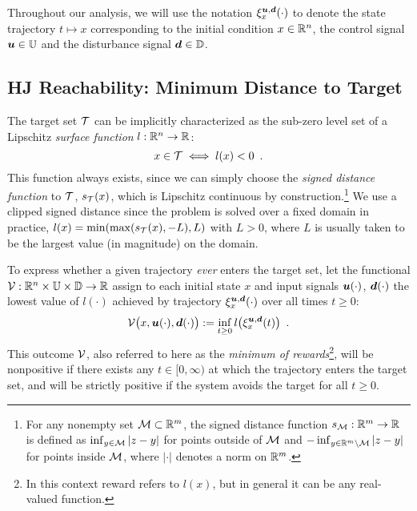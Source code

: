 Throughout our analysis, we will use the notation $\xi_{x}^{\bm{u},\bm{d}}(\cdot)$ to denote the state trajectory $t\mapsto x$ corresponding to the initial condition $x\in\mathbb{R}^n$, the control signal $\bm{u}\in\mathbb{U}$ and the disturbance signal $\bm{d}\in\mathbb{D}$.


\subsection{HJ Reachability: Minimum Distance to Target}
The target set $\mathcal{T}$ can be implicitly characterized as the sub-zero level set of a Lipschitz \emph{surface function} $l:\mathbb{R}^n\rightarrow\mathbb{R}$: 
\begin{equation}\label{eq:l}
x\in\mathcal{T}\iff l(x)<0 \enspace.
\end{equation}
This function always exists, since we can simply choose the \emph{signed distance function} to $\mathcal{T}$,  $s_{\mathcal{T}}(x)$, which is Lipschitz continuous by construction.\footnote{ For any nonempty set $\mathcal{M}\subset\mathbb{R}^m$, the signed distance function $s_{\mathcal{M}}:\mathbb{R}^m\to\mathbb{R}$  is defined as
$\inf_{y\in\mathcal{M}} |z-y|$ for points outside of $\mathcal{M}$ and $ -\inf_{y\in\mathbb{R}^m\setminus\mathcal{M}} |z-y|$ for points inside $\mathcal{M}$, where $|\cdot|$ denotes a norm on $\mathbb{R}^m$.} We use a clipped signed distance since the problem is solved over a fixed domain in practice, $l(x) = \min(\max(s_{\mathcal{T}}(x), -L), L)$ with $L>0$, where $L$ is usually taken to be the largest value (in magnitude) on the domain.

To express whether a given trajectory \emph{ever} enters the target set, let the functional $\mathcal{V}:\mathbb{R}^n\times\mathbb{U}\times\mathbb{D}\to\mathbb{R}$ assign to each initial state $x$ and input signals $\bm{u}(\cdot)$, $\bm{d}(\cdot)$ the lowest value of $l(\cdot)$ achieved by trajectory $\xi_{x}^{\bm{u}, \bm{d}}(\cdot)$ over all times $t\ge0$: 
\begin{equation}\label{eq:min_dist_functional}
\mathcal{V}\big(x,\bm{u}(\cdot),\bm{d}(\cdot)\big) := \inf_{t\ge 0}l\big(\xi_{x}^{\bm{u},\bm{d}}(t)\big) \enspace.
\end{equation}
This outcome $\mathcal{V}$, also referred to here as the \emph{minimum of rewards}\footnote{In this context reward refers to $l(x)$, but in general it can be any real-valued function.}, will be nonpositive if there exists any $t\in[0,\infty)$ at which the trajectory enters the target set, and will be strictly positive if the system avoids the target for all $t\ge 0$. 


